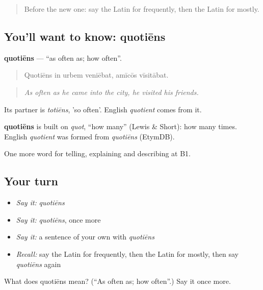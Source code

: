 \label{lesson:LA-C294-quotiens}



\begin{quote}
Before the new one: say the Latin for frequently, then the Latin for mostly.
\end{quote}

\subsection*{You'll want to know: quotiēns}
\textbf{quotiēns} — \textquotedblleft{}as often as; how often\textquotedblright{}.

\begin{quote}
Quotiēns in urbem veniēbat, amīcōs vīsitābat.
\end{quote}

\begin{quote}
\emph{As often as he came into the city, he visited his friends.}
\end{quote}

Its partner is \emph{totiēns}, 'so often'. English \emph{quotient} comes from it.

\begin{cousinweb}
\textbf{quotiēns} is built on \emph{quot}, \textquotedblleft{}how many\textquotedblright{} (Lewis \& Short): how many times. English \emph{quotient} was formed from \emph{quotiēns} (EtymDB).
\end{cousinweb}

\begin{grammarlens}[title={What you've built}]
One more word for telling, explaining and describing at B1.
\end{grammarlens}

\subsection*{Your turn}
\begin{itemize}
\raggedright
  \item \emph{Say it:} \emph{quotiēns}
  \item \emph{Say it:} \emph{quotiēns}, once more
  \item \emph{Say it:} a sentence of your own with \emph{quotiēns}
  \item \emph{Recall:} say the Latin for frequently, then the Latin for mostly, then say \emph{quotiēns} again
\end{itemize}

\begin{tcolorbox}[breakable,colback=teal!4,colframe=teal!35!black,title={Before you move on}]
What does quotiēns mean? (\textquotedblleft{}As often as; how often\textquotedblright{}.) Say it once more.
\end{tcolorbox}
